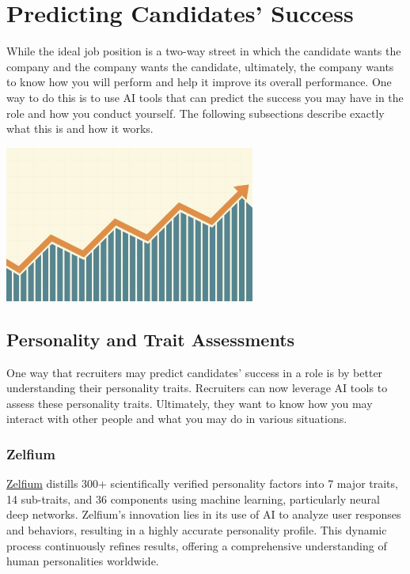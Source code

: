 \documentclass[
]{book}
\begin{document}
\hypertarget{predicting-candidates-success}{%
\chapter{Predicting Candidates' Success}\label{predicting-candidates-success}}

While the ideal job position is a two-way street in which the candidate wants the company and the company wants the candidate, ultimately, the company wants to know how you will perform and help it improve its overall performance. One way to do this is to use AI tools that can predict the success you may have in the role and how you conduct yourself. The following subsections describe exactly what this is and how it works.

\includegraphics[width=3.23958in,height=\textheight]{predict success.jpg}

\hypertarget{personality-and-trait-assessments}{%
\section{Personality and Trait Assessments}\label{personality-and-trait-assessments}}

One way that recruiters may predict candidates' success in a role is by better understanding their personality traits. Recruiters can now leverage AI tools to assess these personality traits. Ultimately, they want to know how you may interact with other people and what you may do in various situations.

\hypertarget{zelfium}{%
\subsection{Zelfium}\label{zelfium}}

\href{https://www.zelfium.com/\#/}{Zelfium} distills 300+ scientifically verified personality factors into 7 major traits, 14 sub-traits, and 36 components using machine learning, particularly neural deep networks. Zelfium's innovation lies in its use of AI to analyze user responses and behaviors, resulting in a highly accurate personality profile. This dynamic process continuously refines results, offering a comprehensive understanding of human personalities worldwide.
\end{document}
